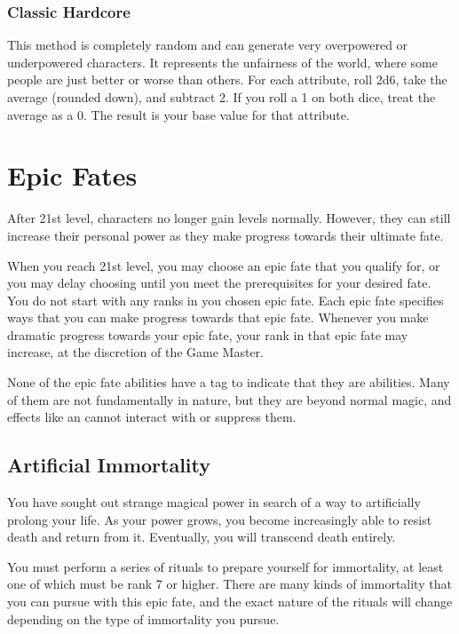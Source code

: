         \subsubsection{Classic Hardcore}

            This method is completely random and can generate very overpowered or underpowered characters.
            It represents the unfairness of the world, where some people are just better or worse than others.
            For each attribute, roll 2d6, take the average (rounded down), and subtract 2.
            If you roll a 1 on both dice, treat the average as a 0.
            The result is your base value for that attribute.

\section{Epic Fates}
    After 21st level, characters no longer gain levels normally.
    However, they can still increase their personal power as they make progress towards their ultimate fate.

    When you reach 21st level, you may choose an epic fate that you qualify for, or you may delay choosing until you meet the prerequisites for your desired fate.
    You do not start with any ranks in you chosen epic fate.
    Each epic fate specifies ways that you can make progress towards that epic fate.
    Whenever you make dramatic progress towards your epic fate, your rank in that epic fate may increase, at the discretion of the Game Master.

    None of the epic fate abilities have a tag to indicate that they are \magical abilities.
    Many of them are not fundamentally  in nature, but they are beyond normal magic, and effects like an  cannot interact with or suppress them.

    \subsection{Artificial Immortality}
        You have sought out strange magical power in search of a way to artificially prolong your life.
        As your power grows, you become increasingly able to resist death and return from it.
        Eventually, you will transcend death entirely.

         You must perform a series of rituals to prepare yourself for immortality, at least one of which must be rank 7 or higher. There are many kinds of immortality that you can pursue with this epic fate, and the exact nature of the rituals will change depending on the type of immortality you pursue.


